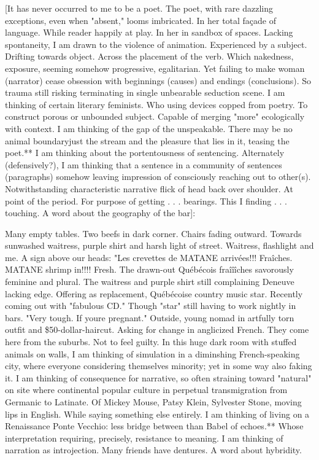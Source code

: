 {[}It has never occurred to me to be a poet. The poet, with rare
dazzling exceptions, even when "absent," looms imbricated. In her total
façade of language. While reader happily at play. In her in sandbox of
spaces. Lacking spontaneity, I am drawn to the violence of animation.
Experienced by a subject. Drifting towards object. Across the placement
of the verb. Which nakedness, exposure, seeming somehow progressive,
egalitarian. Yet failing to make woman (narrator) cease obsession with
beginnings (causes) and endings (conclusions). So trauma still risking
terminating in single unbearable seduction scene. I am thinking of
certain literary feminists. Who using devices copped from poetry. To
construct porous or unbounded subject. Capable of merging "more"
ecologically with context. I am thinking of the gap of the unspeakable.
There may be no animal boundaryjust the stream and the pleasure that
lies in it, teasing the poet.** I am thinking about the portentousness
of sentencing. Alternately (defensively?), I am thinking that a sentence
in a community of sentences (paragraphs) somehow leaving impression of
consciously reaching out to other(s). Notwithstanding characteristic
narrative flick of head back over shoulder. At point of the period. For
purpose of getting . . . bearings. This I finding . . . touching. A word
about the geography of the bar{]}:

Many empty tables. Two beefs in dark corner. Chairs fading outward.
Towards sunwashed waitress, purple shirt and harsh light of street.
Waitress, flashlight and me. A sign above our heads: "Les crevettes de
MATANE arrivées!!! {Fraîches.} MATANE shrimp in!!!! Fresh. The drawn-out
Québécois fraîîîches savorously feminine and plural. The waitress and
purple shirt still complaining Deneuve lacking edge. Offering as
replacement, Québécoise country music star. Recently coming out with
"fabulous CD." Though "star" still having to work nightly in bars. "Very
tough. If youre pregnant." Outside, young nomad in artfully torn outfit
and \$50-dollar-haircut. Asking for change in anglicized French. They
come here from the suburbs. Not to feel guilty. In this huge dark room
with stuffed animals on walls, I am thinking of simulation in a
diminshing French-speaking city, where everyone considering themselves
minority; yet in some way also faking it. I am thinking of consequence
for narrative, so often straining toward "natural" on site where
continental popular culture in perpetual transmigration from Germanic to
Latinate. Of Mickey Mouse, Patsy Klein, Sylvester Stone, moving lips in
English. While saying something else entirely. I am thinking of living
on a Renaissance Ponte Vecchio: less bridge between than Babel of
echoes.** Whose interpretation requiring, precisely, resistance to
meaning. I am thinking of narration as introjection. Many friends have
dentures. A word about hybridity.

